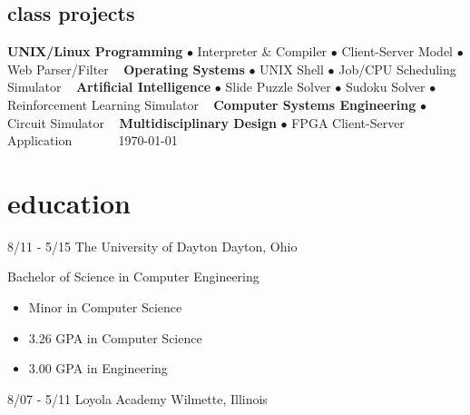 \documentclass[print]{resume}
\begin{document}
\begin{aside}
\section{class projects} 
\textbf{UNIX/Linux Programming}
$\bullet$ Interpreter \& Compiler
$\bullet$ Client-Server Model
$\bullet$ Web Parser/Filter
~
\textbf{Operating Systems}
$\bullet$ UNIX Shell
$\bullet$ Job/CPU Scheduling Simulator
~
\textbf{Artificial Intelligence}
$\bullet$ Slide Puzzle Solver
$\bullet$ Sudoku Solver 
$\bullet$ Reinforcement Learning Simulator
~
\textbf{Computer Systems Engineering}
$\bullet$ Circuit Simulator
~
\textbf{Multidisciplinary Design}
$\bullet$ FPGA Client-Server Application
~
~
~
~
\today
\end{aside}

\section{education}
\begin{entrylist}

\entry
{8/11 - 5/15}
{The University of Dayton}
{Dayton, Ohio}		
{
Bachelor of Science in Computer Engineering
\begin{itemize}
    \item Minor in Computer Science
    \item 3.26 GPA in Computer Science
    \item 3.00 GPA in Engineering
\end{itemize}
}

\entry
{8/07 - 5/11}
{Loyola Academy}
{Wilmette, Illinois}
{}

\end{entrylist}
\end{document}
